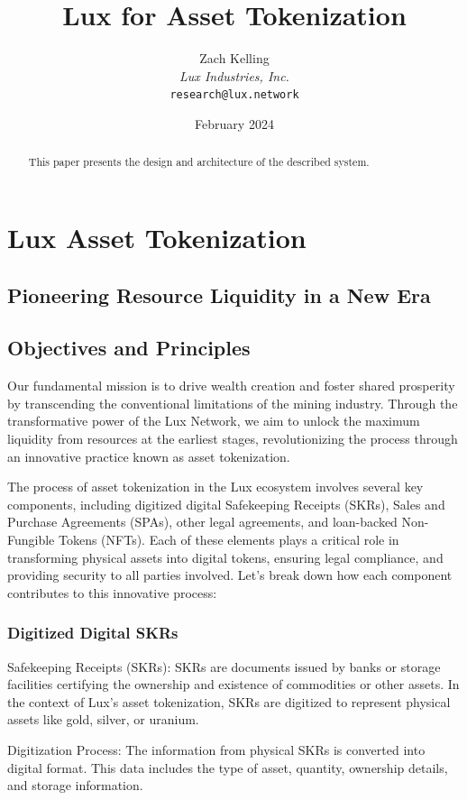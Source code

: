 \documentclass[11pt]{article}
\title{Lux for Asset Tokenization}
\author{Zach Kelling\\\textit{Lux Industries, Inc.}\\\texttt{research@lux.network}}
\date{February 2024}
\begin{document}
\luxcoverpage

\begin{abstract}
This paper presents the design and architecture of the described system.
\end{abstract}

\tableofcontents
\newpage


\section{Lux Asset Tokenization}

\subsection{Pioneering Resource Liquidity in a New Era}

\subsection{Objectives and Principles}

Our fundamental mission is to drive wealth creation and foster shared prosperity by transcending the conventional limitations of the mining industry. Through the transformative power of the Lux Network, we aim to unlock the maximum liquidity from resources at the earliest stages, revolutionizing the process through an innovative practice known as asset tokenization.


The process of asset tokenization in the Lux ecosystem involves several key components, including digitized digital Safekeeping Receipts (SKRs), Sales and Purchase Agreements (SPAs), other legal agreements, and loan-backed Non-Fungible Tokens (NFTs). Each of these elements plays a critical role in transforming physical assets into digital tokens, ensuring legal compliance, and providing security to all parties involved. Let's break down how each component contributes to this innovative process:


\subsubsection{Digitized Digital SKRs}

Safekeeping Receipts (SKRs): SKRs are documents issued by banks or storage facilities certifying the ownership and existence of commodities or other assets. In the context of Lux's asset tokenization, SKRs are digitized to represent physical assets like gold, silver, or uranium.


Digitization Process: The information from physical SKRs is converted into digital format. This data includes the type of asset, quantity, ownership details, and storage information.
\end{document}
